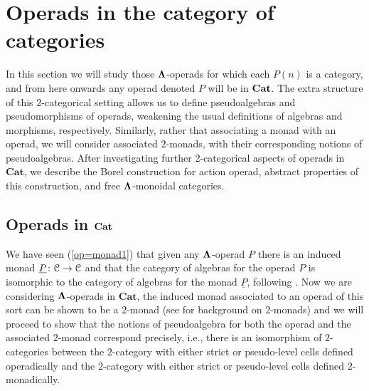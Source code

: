 \section{Operads in the category of categories}


In this section we will study those $\mathbf{\Lambda}$-operads for which each $P(n)$ is a category, and from here onwards any operad denoted $P$ will be in $\mathbf{Cat}$. The extra structure of this $2$-categorical setting allows us to define pseudoalgebras and pseudomorphisms of operads, weakening the usual definitions of algebras and morphisms, respectively. Similarly, rather that associating a monad with an operad, we will consider associated $2$-monads, with their corresponding notions of pseudoalgebras. After investigating further $2$-categorical aspects of operads in $\mathbf{Cat}$, we describe the Borel construction for action operad, abstract properties of this construction, and free $\mathbf{\Lambda}$-monoidal categories.


\subsection{Operads in \texorpdfstring{$\mathbf{Cat}$}{\textbf{Cat}}}\label{section:operads_in_Cat}
We have seen (\cref{op=monad1}) that given any $\mathbf{\Lambda}$-operad $P$ there is an induced monad $\underline{P} \colon \mathcal{C} \rightarrow \mathcal{C}$ and that the category of algebras for the operad $P$ is isomorphic to the category of algebras for the monad $\underline{P}$, following \cite{maygeom}. Now we are considering $\mathbf{\Lambda}$-operads in $\mathbf{Cat}$, the induced monad associated to an operad of this sort can be shown to be a $2$-monad (see \cite{KS} for background on $2$-monads) and we will proceed to show that the notions of pseudoalgebra for both the operad and the associated $2$-monad correspond precisely, i.e., there is an isomorphism of $2$-categories between the $2$-category with either strict or pseudo-level cells defined operadically and the $2$-category with either strict or pseudo-level cells defined $2$-monadically.




